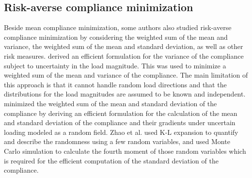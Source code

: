   \subsection{Risk-averse compliance minimization}

    Beside mean compliance minimization, some authors also studied risk-averse compliance minimization by considering the weighted sum of the mean and variance, the weighted sum of the mean and standard deviation, as well as other risk measures. \cite{Dunning2013} derived an efficient formulation for the variance of the compliance subject to uncertainty in the load magnitude. This was used to minimize a weighted sum of the mean and variance of the compliance. The main limitation of this approach is that it cannot handle random load directions and that the distributions for the load magnitudes are assumed to be known and independent. \cite{Zhao2014b} minimized the weighted sum of the mean and standard deviation of the compliance by deriving an efficient formulation for the calculation of the mean and standard deviation of the compliance and their gradients under uncertain loading modeled as a random field. Zhao et al. used K-L expansion to quantify and describe the randomness using a few random variables, and used Monte Carlo simulation to calculate the fourth moment of those random variables which is required for the efficient computation of the standard deviation of the compliance.

